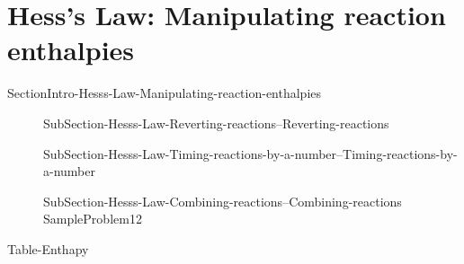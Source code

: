 \documentclass[main.tex]{subfiles}
\newcommand\chapterlabel{Ch-thermochemistry}\setcounter{figurenewcounter}{0}\setcounter{tablenewcounter}{0}\setcounter{formulanewcounter}{0}
\begin{document}
 \section{Hess's Law: Manipulating reaction enthalpies }%
{SectionIntro-Hesss-Law-Manipulating-reaction-enthalpies}%
\sloppy\begin{description}%
\item[] {SubSection-Hesss-Law-Reverting-reactions--Reverting-reactions}%
 \item[] {SubSection-Hesss-Law-Timing-reactions-by-a-number--Timing-reactions-by-a-number}%
  \item[] {SubSection-Hesss-Law-Combining-reactions--Combining-reactions} %
   {SampleProblem12}%
\end{description}%



{Table-Enthapy}%
\end{document}
